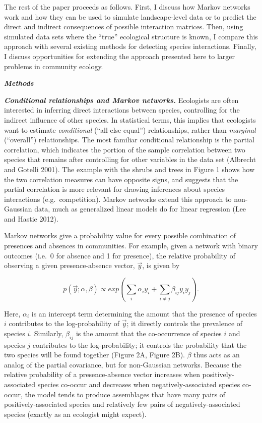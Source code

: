 \documentclass[12pt,]{article}
\begin{document}
\begin{spacing}{1.9}
\begin{flushleft}
The rest of the paper proceeds as follows. First, I discuss how Markov
networks work and how they can be used to simulate landscape-level data
or to predict the direct and indirect consequences of possible
interaction matrices. Then, using simulated data sets where the ``true''
ecological structure is known, I compare this approach with several
existing methods for detecting species interactions. Finally, I discuss
opportunities for extending the approach presented here to larger
problems in community ecology.

\textbf{\emph{Methods}}

\textbf{\emph{Conditional relationships and Markov networks.}}
Ecologists are often interested in inferring direct interactions between
species, controlling for the indirect influence of other species. In
statistical terms, this implies that ecologists want to estimate
\emph{conditional} (``all-else-equal'') relationships, rather than
\emph{marginal} (``overall'') relationships. The most familiar
conditional relationship is the partial correlation, which indicates the
portion of the sample correlation between two species that remains after
controlling for other variables in the data set (Albrecht and Gotelli
2001). The example with the shrubs and trees in Figure 1 shows how the
two correlation measures can have opposite signs, and suggests that the
partial correlation is more relevant for drawing inferences about
species interactions (e.g.~competition). Markov networks extend this
approach to non-Gaussian data, much as generalized linear models do for
linear regression (Lee and Hastie 2012).

Markov networks give a probability value for every possible combination
of presences and absences in communities. For example, given a network
with binary outcomes (i.e.~0 for absence and 1 for presence), the
relative probability of observing a given presence-absence vector,
\(\vec{y}\), is given by

\[p(\vec{y}; \alpha, \beta) \propto exp(\sum_{i}\alpha_i y_i + \sum_{i\neq j}\beta_{ij}y_i y_j).\]

Here, \(\alpha_{i}\) is an intercept term determining the amount that
the presence of species \(i\) contributes to the log-probability of
\(\vec{y}\); it directly controls the prevalence of species \(i\).
Similarly, \(\beta_{ij}\) is the amount that the co-occurrence of
species \(i\) and species \(j\) contributes to the log-probability; it
controls the probability that the two species will be found together
(Figure 2A, Figure 2B). \(\beta\) thus acts as an analog of the partial
covariance, but for non-Gaussian networks. Because the relative
probability of a presence-absence vector increases when
positively-associated species co-occur and decreases when
negatively-associated species co-occur, the model tends to produce
assemblages that have many pairs of positively-associated species and
relatively few pairs of negatively-associated species (exactly as an
ecologist might expect).


\end{flushleft}
\end{spacing}
\end{document}
